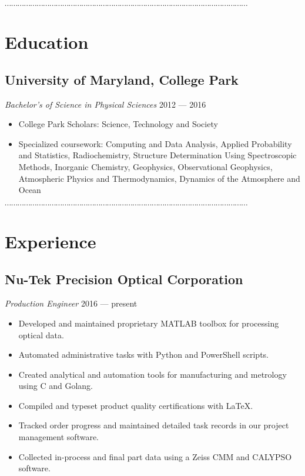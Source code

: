 \documentclass[10pt]{article}
\newcommand{\dotfringe}{
    \begin{center}
      $\cdots\cdots\cdots\cdots\cdots\cdots\cdots\cdots\cdots\cdots\cdots\cdots\cdots\cdots\cdots\cdots\cdots\cdots\cdots\cdots\cdots\cdots\cdots\cdots\cdots\cdots\cdots\cdots\cdots\cdots\cdots\cdots\cdots\cdots\cdots\cdots\cdots\cdots$
    \end{center}
}
\begin{document}

\dotfringe{}

\section*{Education}
\subsection*{University of Maryland, College Park}
\textit{Bachelor's of Science in Physical Sciences} \hfill 2012 --- 2016
\begin{itemize}
  \item College Park Scholars: Science, Technology and Society
  \item Specialized coursework: Computing and Data Analysis, Applied Probability and Statistics, Radiochemistry, Structure Determination Using Spectroscopic Methods, Inorganic Chemistry, Geophysics, Observational Geophysics, Atmospheric Physics and Thermodynamics, Dynamics of the Atmosphere and Ocean
\end{itemize}

\dotfringe{}

\section*{Experience}
\subsection*{Nu-Tek Precision Optical Corporation}
\textit{Production Engineer} \hfill 2016 --- present
\begin{itemize}
  \item Developed and maintained proprietary MATLAB toolbox for processing optical data.
  \item Automated administrative tasks with Python and PowerShell scripts.
  \item Created analytical and automation tools for manufacturing and metrology using C and Golang.
  \item Compiled and typeset product quality certifications with \LaTeX{}.
  \item Tracked order progress and maintained detailed task records in our project management software.
  \item Collected in-process and final part data using a Zeiss CMM and CALYPSO software.
\end{itemize}
\end{document}
